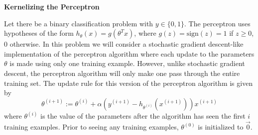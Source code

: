 \item {} {\bf Kernelizing the Perceptron}

Let there be a binary classification problem with $y \in \{0, 1\}$.  The
perceptron uses hypotheses of the form $h_\theta(x) = g(\theta^T x)$, where
$g(z) = \text{sign}(z) = 1$ if $z \ge 0$, $0$ otherwise.  In this problem we
will consider a stochastic gradient descent-like implementation of the
perceptron algorithm where each update to the parameters $\theta$ is made using
only one training example.  However, unlike stochastic gradient descent, the
perceptron algorithm will only make one pass through the entire training set.
The update rule for this version of the perceptron algorithm is given by
\begin{equation*}
  \theta^{(i+1)} :=
	  \theta^{(i)} + \alpha (y^{(i+1)} - h_{\theta^{(i)}}(x^{(i+1)})) x^{(i+1)}
\end{equation*}
where $\theta^{(i)}$ is the value of the parameters after the algorithm has
seen the first $i$ training examples. Prior to seeing any training examples,
$\theta^{(0)}$ is initialized to $\vec{0}$.

\begin{enumerate}
  

\ifnum{} {
  
} \fi

  

\ifnum{} {
  
} \fi


  

\ifnum{} {
  
} \fi

\end{enumerate}
